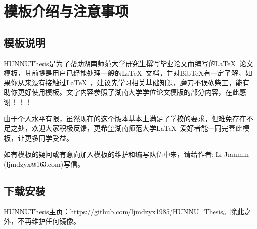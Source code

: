 \chapter{模板介绍与注意事项}
\section{模板说明}
HUNNUThesis是为了帮助湖南师范大学研究生撰写毕业论文而编写的\LaTeX~论文模板，其前提是用户已经能处理一般的\LaTeX~文档，并对BibTeX有一定了解，如果你从来没有接触过\LaTeX~，建议先学习相关基础知识，磨刀不误砍柴工，能有助你更好使用模板。文字内容参照了湖南大学学位论文模版的部分内容，在此感谢！！！

由于个人水平有限，虽然现在的这个版本基本上满足了学校的要求，但难免存在不足之处，欢迎大家积极反馈，更希望湖南师范大学\LaTeX~爱好者能一同完善此模板，让更多同学受益。

如有模板的疑问或有意向加入模板的维护和编写队伍中来，请给作者: Li Jianmin (ljmdzyx@163.com)写信。
\section{下载安装}
HUNNUThesis主页：\url{https://github.com/ljmdzyx1985/HUNNU_Thesis}。除此之外，不再维护任何镜像。
